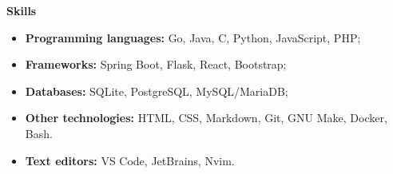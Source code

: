 {\vspace{0.5cm} \hspace{-0.5cm} \Large \textbf{Skills}}

\begin{itemize}
    \item \textbf{Programming languages:} Go, Java, C, Python, JavaScript, PHP;
    \item \textbf{Frameworks:} Spring Boot, Flask, React, Bootstrap;
    \item \textbf{Databases:} SQLite, PostgreSQL, MySQL/MariaDB;
    \item \textbf{Other technologies:} HTML, CSS, Markdown, Git, GNU Make, Docker, Bash.
    \item \textbf{Text editors:} VS Code, JetBrains, Nvim.
\end{itemize}